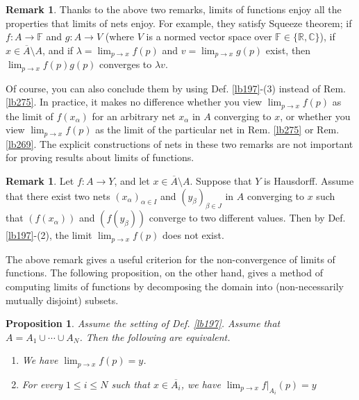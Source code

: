 \documentclass[12pt,b5paper,notitlepage]{article}
\theoremstyle{definition}
\newtheorem{rem}[df]{Remark}
\theoremstyle{plain}
\newtheorem{pp}[df]{Proposition}
\newcommand{\ovl}{\overline}
\newcommand{\Cbb}{\mathbb C}
\newcommand{\Rbb}{\mathbb R}
\newcommand{\Fbb}{\mathbb F}
\newcommand{\dps}{\displaystyle}
\numberwithin{equation}{section}
\begin{document}
\begin{rem}\label{lb318}
Thanks to the above two remarks, limits of functions enjoy all the properties that limits of nets enjoy. For example, they satisfy Squeeze theorem; if $f:A\rightarrow \Fbb$ and $g:A\rightarrow V$ (where $V$ is a normed vector space over $\Fbb\in\{\Rbb,\Cbb\}$), if $x\in\ovl A\setminus A$,  and if $\lambda=\lim_{p\rightarrow x}f(p)$ and $v=\lim_{p\rightarrow x}g(p)$ exist, then $\lim_{p\rightarrow x}f(p)g(p)$ converges to $\lambda v$. 

Of course, you can also conclude them by using Def. \ref{lb197}-(3) instead of Rem. \ref{lb275}. In practice, it makes no difference whether you view $\lim_{p\rightarrow x}f(p)$ as the limit of $f(x_\alpha)$ for an arbitrary net $x_\alpha$ in $A$ converging to $x$, or whether you view  $\lim_{p\rightarrow x}f(p)$ as the limit of the particular net in Rem. \ref{lb275} or Rem. \ref{lb269}. The explicit constructions of nets in these two remarks are not important for proving results about limits of functions.   \hfill\qedsymbol
\end{rem}




\begin{rem}\label{lb202}
Let $f:A\rightarrow Y$, and let $x\in\ovl A\setminus A$. Suppose that $Y$ is Hausdorff. Assume that there exist two nets $(x_\alpha)_{\alpha\in I}$ and $(y_\beta)_{\beta\in J}$ in $A$ converging to $x$ such that $(f(x_\alpha))$ and $(f(y_\beta))$ converge to two different values. Then by Def. \ref{lb197}-(2), the limit $\lim_{p\rightarrow x}f(p)$ does not exist.
\end{rem}


The above remark gives a useful criterion for the non-convergence of limits of functions. The following proposition, on the other hand, gives a method of computing limits of functions by decomposing the domain into (non-necessarily mutually disjoint) subsets.


\begin{pp}\label{lb199}
Assume the setting of Def. \ref{lb197}. Assume that $A=A_1\cup\cdots\cup A_N$. Then the following are equivalent.
\begin{enumerate}[label=(\arabic*)]
\item We have $\dps \lim_{p\rightarrow x} f(p)=y$.
\item For every $1\leq i\leq N$ such that $x\in\ovl {A_i}$, we have $\dps\lim_{p\rightarrow x} f|_{A_i}(p)=y$
\end{enumerate}
\end{pp}
\end{document}
